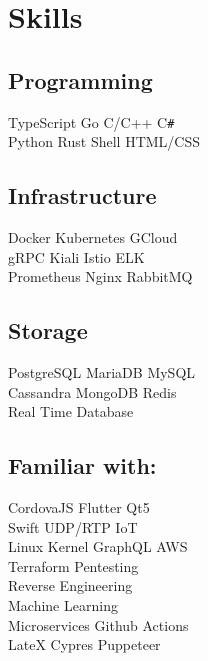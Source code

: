 \documentclass[]{resume}
\begin{document}
\begin{minipage}[t]{0.33\textwidth}

\section{Skills}
\ello
\subsection{Programming}

TypeScript \textbullet{} Go \textbullet{} C/C++ \textbullet{} C\texttt{\#} \\
Python \textbullet{} Rust \textbullet{} Shell \textbullet{} HTML/CSS\newline

\subsection{Infrastructure}
Docker \textbullet{} Kubernetes \textbullet{} GCloud \\
gRPC \textbullet{} Kiali \textbullet{} Istio \textbullet{} ELK \\
Prometheus \textbullet{}  Nginx \textbullet{} RabbitMQ\newline


\subsection{Storage}
PostgreSQL \textbullet{} MariaDB \textbullet{} MySQL\\
Cassandra \textbullet{} MongoDB \textbullet{} Redis\\
Real Time Database\newline

\subsection{Familiar with:}
\ello
CordovaJS \textbullet{} Flutter \textbullet{} Qt5\\
Swift \textbullet{} UDP/RTP  \textbullet{} IoT \\
Linux Kernel \textbullet{}  GraphQL \textbullet{} AWS\\
Terraform \textbullet{} Pentesting\\
Reverse Engineering\\
Machine Learning\\
Microservices \textbullet{} Github Actions\\
LateX \textbullet{} Cypres \textbullet{} Puppeteer\newline


\end{minipage}
\end{document}

